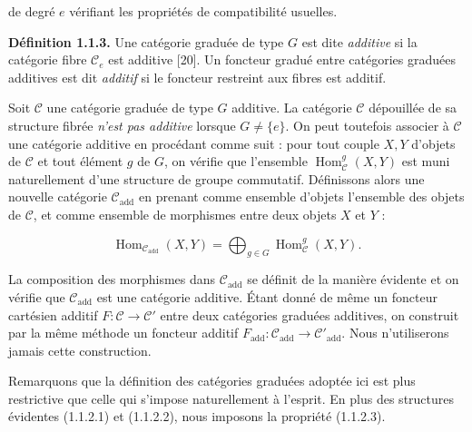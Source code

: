 %
de degré $e$ vérifiant les propriétés de compatibilité usuelles.

\noindent\textbf{Définition 1.1.3.}\quad
Une catégorie graduée de type $G$ est dite \emph{additive} si la catégorie
fibre $\mathcal C_e$ est additive [20].
Un foncteur gradué entre catégories graduées additives est dit
\emph{additif} si le foncteur restreint aux fibres est additif.

Soit $\mathcal C$ une catégorie graduée de type $G$ additive. La catégorie
$\mathcal C$ dépouillée de sa structure fibrée \emph{n'est pas additive}
lorsque $G\neq\{e\}$. On peut toutefois associer à $\mathcal C$ une
catégorie additive en procédant comme suit : pour tout couple $X,Y$
d'objets de $\mathcal C$ et tout élément $g$ de $G$, on vérifie que
l'ensemble $\operatorname{Hom}_{\mathcal C}^{g}(X,Y)$ est muni
naturellement d'une structure de groupe commutatif. Définissons alors une
nouvelle catégorie $\mathcal C_{\mathrm{add}}$ en prenant comme ensemble
d'objets l'ensemble des objets de $\mathcal C$, et comme ensemble de
morphismes entre deux objets $X$ et $Y$ :

\begingroup
\makeatletter
\tagsleft@true
\let\veqno\@@leqno
\makeatother
\begin{equation}
  \operatorname{Hom}_{\mathcal C_{\mathrm{add}}}(X,Y)
  =\bigoplus_{g\in G}\operatorname{Hom}_{\mathcal C}^{g}(X,Y).
  \tag{1.1.3.1}
\end{equation}
\endgroup

La composition des morphismes dans $\mathcal C_{\mathrm{add}}$ se définit
de la manière évidente et on vérifie que $\mathcal C_{\mathrm{add}}$ est
une catégorie additive.
Étant donné de même un foncteur cartésien additif
$F\colon\mathcal C\to\mathcal C'$ entre deux catégories graduées
additives, on construit par la même méthode un foncteur additif
$F_{\mathrm{add}}\colon\mathcal C_{\mathrm{add}}\to
\mathcal C'_{\mathrm{add}}$. Nous n'utiliserons jamais cette construction.

Remarquons que la définition des catégories graduées adoptée ici est plus
restrictive que celle qui s'impose naturellement à l'esprit. En plus des
structures évidentes (1.1.2.1) et (1.1.2.2), nous imposons la propriété
(1.1.2.3).

